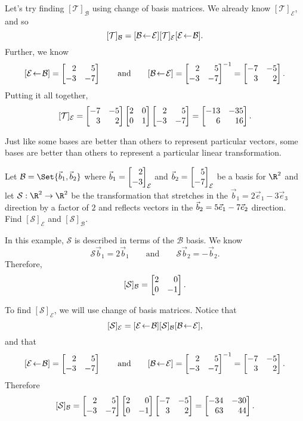 \begin{example}
	Let's try finding $[\mathcal T]_{\mathcal B}$ using change of basis matrices. We already know $[\mathcal T]_{\mathcal E}$, and so
	\[
		[\mathcal T]_{\mathcal B} = \BasisChange{\mathcal E}{\mathcal B}[\mathcal T]_{\mathcal E}\BasisChange{\mathcal B}{\mathcal E}.
	\]
	Further, we know
	\[
		\BasisChange{\mathcal B}{\mathcal E}=\mat{2&5\\-3&-7}\qquad \text{and}\qquad
		\BasisChange{\mathcal E}{\mathcal B}=\mat{2&5\\-3&-7}^{-1}=\mat{-7&-5\\3&2}.
	\]
	Putting it all together,
	\[
		[\mathcal T]_{\mathcal E}=\mat{-7&-5\\3&2}\mat{2&0\\0&1}\mat{2&5\\-3&-7} = \mat{-13&-35\\6&16}.
	\]

\end{example}


Just like some bases are better than others to represent particular vectors, some bases are better than others
to represent a particular linear transformation.

\begin{example}
	Let $\mathcal B=\Set{\vec b_1,\vec b_2}$ where $\vec b_1=\mat{2\\-3}_{\mathcal E}$ and $\vec b_2=\mat{5\\-7}_{\mathcal E}$
	be a basis for $\R^2$ and let $\mathcal S:\R^2\to\R^2$ be the transformation that stretches in the $\vec b_1=2\vec e_1-3\vec e_3$ direction 
	by a factor of $2$ and reflects vectors in the $\vec b_2=5\xhat-7\yhat$ direction. 
	Find $[\mathcal S]_{\mathcal E}$ and $[\mathcal S]_{\mathcal B}$.

	In this example, $\mathcal S$ is described in terms of the $\mathcal B$ basis. We know
	\[
		\mathcal S\vec b_1=2\vec b_1\qquad\text{and}\qquad\mathcal S\vec b_2=-\vec b_2.
	\]
	Therefore,
	\[
		[\mathcal S]_{\mathcal B}=\mat{2&0\\0&-1}.
	\]

	To find $[\mathcal S]_{\mathcal E}$, we will use change of basis matrices. Notice that
	\[
		[\mathcal S]_{\mathcal E} = \BasisChange{\mathcal B}{\mathcal E}[\mathcal S]_{\mathcal B}\BasisChange{\mathcal E}{\mathcal B},
	\]
	and that
	\[
		\BasisChange{\mathcal B}{\mathcal E}=\mat{2&5\\-3&-7}\qquad \text{and}\qquad
		\BasisChange{\mathcal E}{\mathcal B}=\mat{2&5\\-3&-7}^{-1}=\mat{-7&-5\\3&2}.
	\]
	Therefore
	\[
		[\mathcal S]_{\mathcal B} = \mat{2&5\\-3&-7}\mat{2&0\\0&-1}\mat{-7&-5\\3&2}=\mat{-34&-30\\63&44}.
	\]
\end{example}

